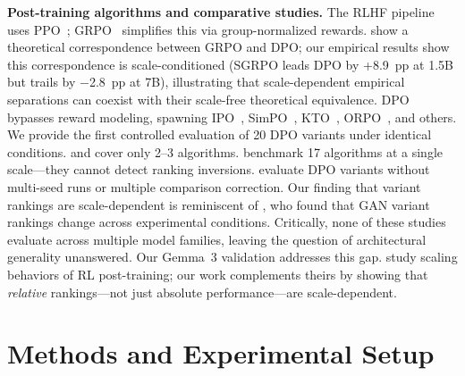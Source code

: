 \documentclass{article}
\begin{document}
\textbf{Post-training algorithms and comparative studies.}
The RLHF pipeline~\citep{ouyang2022training} uses PPO~\citep{schulman2017proximal}; GRPO~\citep{shao2024deepseekmath} simplifies this via group-normalized rewards.
\citet{wu2025grpo_dpo} show a theoretical correspondence between GRPO and DPO; our empirical results show this correspondence is scale-conditioned (SGRPO leads DPO by +8.9~pp at 1.5B but trails by $-$2.8~pp at 7B), illustrating that scale-dependent empirical separations can coexist with their scale-free theoretical equivalence.
DPO~\citep{rafailov2023direct} bypasses reward modeling, spawning IPO~\citep{azar2024general}, SimPO~\citep{meng2024simpo}, KTO~\citep{ethayarajh2024kto}, ORPO~\citep{hong2024orpo}, and others.
We provide the first controlled evaluation of 20 DPO variants under identical conditions.
\citet{xu2024dpo} and \citet{ivison2024unpacking} cover only 2--3 algorithms.
\citet{spangher2025rlhf} benchmark 17 algorithms at a single scale---they cannot detect ranking inversions.
\citet{saeidi2025dpo_variants} evaluate DPO variants without multi-seed runs or multiple comparison correction.
Our finding that variant rankings are scale-dependent is reminiscent of \citet{lucic2018gans}, who found that GAN variant rankings change across experimental conditions.
Critically, none of these studies evaluate across multiple model families, leaving the question of architectural generality unanswered. Our Gemma~3 validation addresses this gap.
\citet{tan2025rl_scaling} study scaling behaviors of RL post-training; our work complements theirs by showing that \emph{relative} rankings---not just absolute performance---are scale-dependent.

\section{Methods and Experimental Setup}
\label{sec:methods}

\label{sec:framework}
\end{document}
